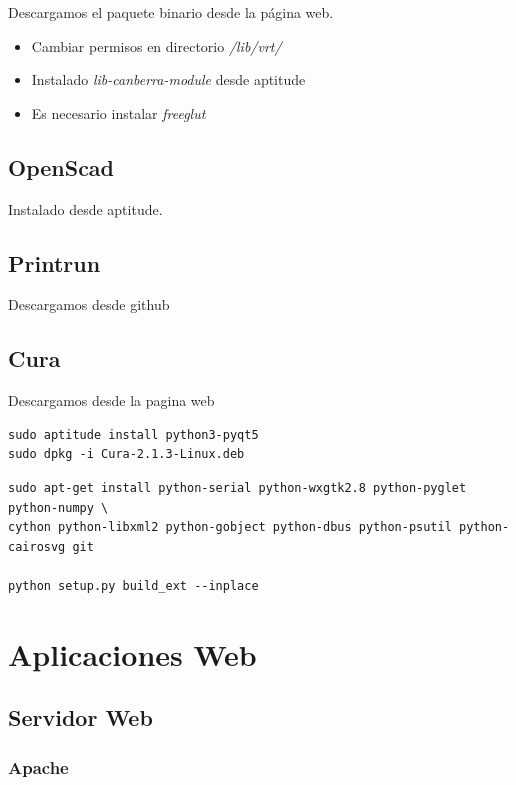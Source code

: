 \documentclass[12pt,spanish,]{article}
\providecommand{\tightlist}{%
  \setlength{\itemsep}{0pt}\setlength{\parskip}{0pt}}
\begin{document}
Descargamos el paquete binario desde la página web.

\begin{itemize}
\tightlist
\item
  Cambiar permisos en directorio \emph{/lib/vrt/}
\item
  Instalado \emph{lib-canberra-module} desde aptitude
\item
  Es necesario instalar \emph{freeglut}
\end{itemize}

\subsection{OpenScad}\label{openscad}

Instalado desde aptitude.

\subsection{Printrun}\label{printrun}

Descargamos desde github

\subsection{Cura}\label{cura}

Descargamos desde la pagina web

\begin{verbatim}
sudo aptitude install python3-pyqt5
sudo dpkg -i Cura-2.1.3-Linux.deb
\end{verbatim}

\begin{verbatim}
sudo apt-get install python-serial python-wxgtk2.8 python-pyglet python-numpy \
cython python-libxml2 python-gobject python-dbus python-psutil python-cairosvg git

python setup.py build_ext --inplace
\end{verbatim}

\section{Aplicaciones Web}\label{aplicaciones-web}

\subsection{Servidor Web}\label{servidor-web}

\subsubsection{Apache}\label{apache}
\end{document}

